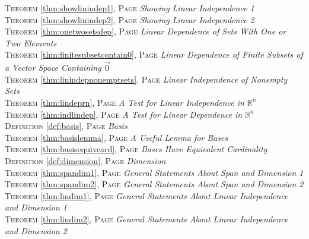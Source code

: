 \begin{multicols}{2}
{         \textsc{Theorem} \ref{thm:showlinindep1}, \textsc{Page} \pageref{thm:showlinindep1} \textit{Showing Linear Independence 1} \\
         \textsc{Theorem} \ref{thm:showlinindep2}, \textsc{Page} \pageref{thm:showlinindep2} \textit{Showing Linear Independence 2} \\
         \textsc{Theorem} \ref{thm:onetwosetsdep}, \textsc{Page} \pageref{thm:onetwosetsdep} \textit{Linear Dependence of Sets With One or Two Elements} \\
         \textsc{Theorem} \ref{thm:finitesubsetcontain0}, \textsc{Page} \pageref{thm:finitesubsetcontain0} \textit{Linear Dependence of Finite Subsets of a Vector Space Containing \(\vec {0}\)} \\
         \textsc{Theorem} \ref{thm:linindepnonemptsets}, \textsc{Page} \pageref{thm:linindepnonemptsets} \textit{Linear Independence of Nonempty Sets} \\
         \textsc{Theorem} \ref{thm:lindeprn}, \textsc{Page} \pageref{thm:lindeprn} \textit{A Test for Linear Independence in \(\mathbb {R}^n\)} \\
         \textsc{Theorem} \ref{thm:indlindep}, \textsc{Page} \pageref{thm:indlindep} \textit{A Test for Linear Dependence in \(\mathbb {R}^n\)} \\
         \textsc{Definition} \ref{def:basis}, \textsc{Page} \pageref{def:basis} \textit{Basis} \\
         \textsc{Theorem} \ref{thm:basislemma}, \textsc{Page} \pageref{thm:basislemma} \textit{A Useful Lemma for Bases} \\
         \textsc{Theorem} \ref{thm:basisequivcard}, \textsc{Page} \pageref{thm:basisequivcard} \textit{Bases Have Equivalent Cardinality} \\
         \textsc{Definition} \ref{def:dimension}, \textsc{Page} \pageref{def:dimension} \textit{Dimension} \\
         \textsc{Theorem} \ref{thm:spandim1}, \textsc{Page} \pageref{thm:spandim1} \textit{General Statements About Span and Dimension 1} \\
         \textsc{Theorem} \ref{thm:spandim2}, \textsc{Page} \pageref{thm:spandim2} \textit{General Statements About Span and Dimension 2} \\
         \textsc{Theorem} \ref{thm:lindim1}, \textsc{Page} \pageref{thm:lindim1} \textit{General Statements About Linear Independence and Dimension 1} \\
         \textsc{Theorem} \ref{thm:lindim2}, \textsc{Page} \pageref{thm:lindim2} \textit{General Statements About Linear Independence and Dimension 2} \\
}
\end{multicols}

